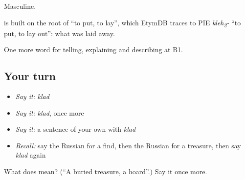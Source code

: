 Masculine.

\begin{cousinweb}
\emph{} is built on the root of \emph{} \textquotedblleft{}to put, to lay\textquotedblright{}, which EtymDB traces to PIE \emph{kleh\textsubscript{2}-} \textquotedblleft{}to put, to lay out\textquotedblright{}: what was laid away.
\end{cousinweb}

\begin{grammarlens}[title={What you've built}]
One more word for telling, explaining and describing at B1.
\end{grammarlens}

\subsection*{Your turn}
\begin{itemize}
\raggedright
  \item \emph{Say it:} \emph{klad}
  \item \emph{Say it:} \emph{klad}, once more
  \item \emph{Say it:} a sentence of your own with \emph{klad}
  \item \emph{Recall:} say the Russian for a find, then the Russian for a treasure, then say \emph{klad} again
\end{itemize}

\begin{tcolorbox}[breakable,colback=teal!4,colframe=teal!35!black,title={Before you move on}]
What does  mean? (\textquotedblleft{}A buried treasure, a hoard\textquotedblright{}.) Say it once more.
\end{tcolorbox}
